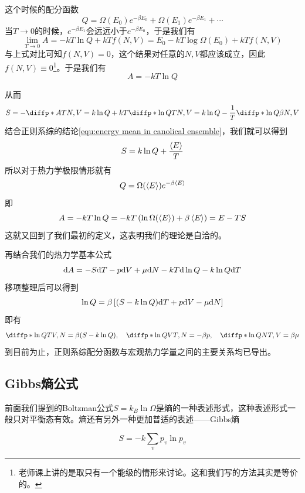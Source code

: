 这个时候的配分函数\begin{equation}
       Q=\Omega(E_0) e^{-\beta E_0}+\Omega(E_1)e^{-\beta E_1}+\cdots
\end{equation}
当$T\to 0$的时候，$e^{-\beta E_1}$会远远小于$e^{-\beta E_0}$，于是我们有\begin{equation}
       \lim_{T\to 0} A=-kT\ln Q+kT f(N,V)=E_0 -kT\log \Omega(E_0) +kT f(N,V)
\end{equation}
与上式对比可知$f(N,V)=0$，这个结果对任意的$N,V$都应该成立，因此$f(N,V)\equiv 0$\footnote{老师课上讲的是取只有一个能级的情形来讨论。这和我们写的方法其实是等价的。}。于是我们有\begin{equation}
       A=-kT\ln Q
\end{equation}

从而\begin{equation}
       S=-\diffp*{A}{T}{N,V}=k\ln Q +k T \diffp*{\ln Q}{T}{N,V}=k\ln Q -\frac{1}{T}\diffp*{\ln Q}{\beta}{N,V}
\end{equation}
结合正则系综的结论\ref{equ:energy mean in canolical ensemble}，我们就可以得到\begin{equation}
       S=k\ln Q +\frac{\braket{E}}{T}
\end{equation}
所以对于热力学极限情形就有\begin{equation}
       Q=\Omega(\braket{E}) e^{-\beta \braket{E}}
\end{equation}
即\begin{equation}
       A=-kT\ln Q =-kT\left(\ln \Omega(\braket{E}) +\beta \braket{E}\right)=E-TS
\end{equation}
这就又回到了我们最初的定义，这表明我们的理论是自洽的。

再结合我们的热力学基本公式\begin{equation}
       \mathrm{d} A=-S\mathrm{d} T-p\mathrm{d} V+\mu \mathrm{d} N-kT \mathrm{d} \ln Q -k \ln Q \mathrm{d} T
\end{equation}
移项整理后可以得到\begin{equation}
       \ln Q=\beta \left[(S-k\ln Q)\mathrm{d} T +p\mathrm{d} V -\mu \mathrm{d} N\right]
\end{equation}
即有\begin{equation}
       \diffp*{\ln Q}{T}{V,N}=\beta (S-k\ln Q),\quad \diffp*{\ln Q}{V}{T,N}=-\beta p,\quad \diffp*{\ln Q}{N}{T,V}=\beta \mu 
\end{equation}
到目前为止，正则系综配分函数与宏观热力学量之间的主要关系均已导出。
\subsection{Gibbs熵公式} %
\label{sub:Gibbs熵公式}
前面我们提到的Boltzman公式$S=k_B\ln \Omega$是熵的一种表述形式，这种表述形式一般只对平衡态有效。熵还有另外一种更加普适的表述——Gibbs熵\begin{definition}[Gibbs熵]
       \begin{equation}
              S=-k\sum_v p_v \ln p_v
       \end{equation}
\end{definition}

